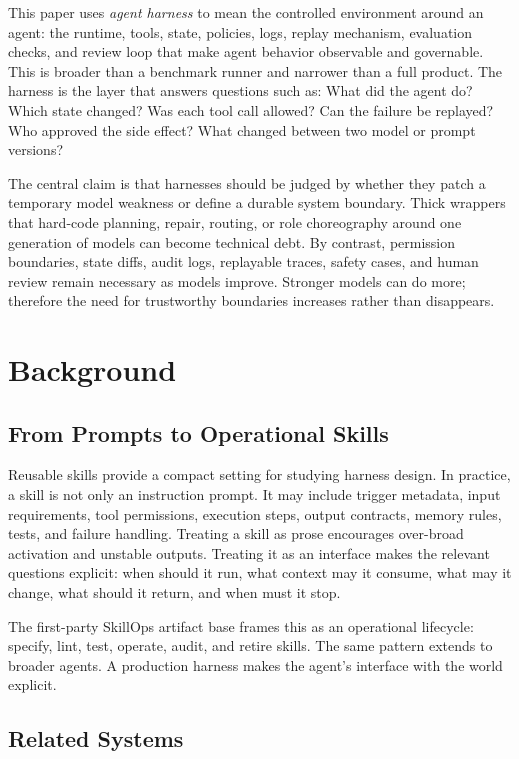 \documentclass[11pt]{article}
\begin{document}
This paper uses \emph{agent harness} to mean the controlled environment around an agent: the runtime, tools, state, policies, logs, replay mechanism, evaluation checks, and review loop that make agent behavior observable and governable. This is broader than a benchmark runner and narrower than a full product. The harness is the layer that answers questions such as: What did the agent do? Which state changed? Was each tool call allowed? Can the failure be replayed? Who approved the side effect? What changed between two model or prompt versions?

The central claim is that harnesses should be judged by whether they patch a temporary model weakness or define a durable system boundary. Thick wrappers that hard-code planning, repair, routing, or role choreography around one generation of models can become technical debt. By contrast, permission boundaries, state diffs, audit logs, replayable traces, safety cases, and human review remain necessary as models improve. Stronger models can do more; therefore the need for trustworthy boundaries increases rather than disappears.

\section{Background}

\subsection{From Prompts to Operational Skills}

Reusable skills provide a compact setting for studying harness design. In practice, a skill is not only an instruction prompt. It may include trigger metadata, input requirements, tool permissions, execution steps, output contracts, memory rules, tests, and failure handling. Treating a skill as prose encourages over-broad activation and unstable outputs. Treating it as an interface makes the relevant questions explicit: when should it run, what context may it consume, what may it change, what should it return, and when must it stop.

The first-party SkillOps artifact base frames this as an operational lifecycle: specify, lint, test, operate, audit, and retire skills. The same pattern extends to broader agents. A production harness makes the agent's interface with the world explicit.

\subsection{Related Systems}
\end{document}
